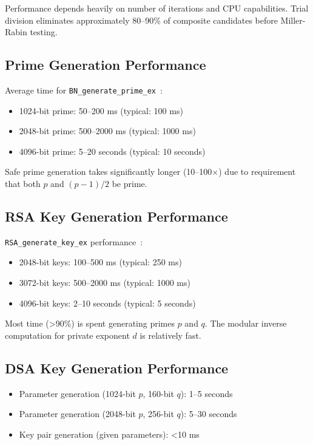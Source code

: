 Performance depends heavily on number of iterations and CPU capabilities. Trial division eliminates approximately 80--90\% of composite candidates before Miller-Rabin testing.

\subsection{Prime Generation Performance}
Average time for \texttt{BN\_generate\_prime\_ex}~\cite{menezes1996handbook}:
\begin{itemize}
    \item 1024-bit prime: 50--200 ms (typical: 100 ms)
    \item 2048-bit prime: 500--2000 ms (typical: 1000 ms)
    \item 4096-bit prime: 5--20 seconds (typical: 10 seconds)
\end{itemize}

Safe prime generation takes significantly longer (10--100$\times$) due to requirement that both $p$ and $(p-1)/2$ be prime.

\subsection{RSA Key Generation Performance}
\texttt{RSA\_generate\_key\_ex} performance~\cite{rivest1978method}:
\begin{itemize}
    \item 2048-bit keys: 100--500 ms (typical: 250 ms)
    \item 3072-bit keys: 500--2000 ms (typical: 1000 ms)
    \item 4096-bit keys: 2--10 seconds (typical: 5 seconds)
\end{itemize}

Most time (>90\%) is spent generating primes $p$ and $q$. The modular inverse computation for private exponent $d$ is relatively fast.

\subsection{DSA Key Generation Performance}
\begin{itemize}
    \item Parameter generation (1024-bit $p$, 160-bit $q$): 1--5 seconds
    \item Parameter generation (2048-bit $p$, 256-bit $q$): 5--30 seconds
    \item Key pair generation (given parameters): <10 ms
\end{itemize}

